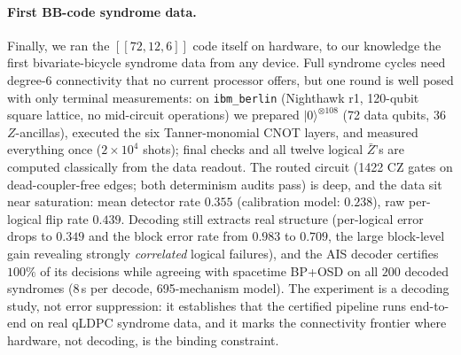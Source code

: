 \documentclass[a4paper,11pt]{quantumarticle}
\theoremstyle{definition}
\begin{document}
\paragraph{First BB-code syndrome data.}
Finally, we ran the $[\![72,12,6]\!]$ code itself on hardware, to our
knowledge the first bivariate-bicycle syndrome data from any device. Full
syndrome cycles need degree-6 connectivity that no current processor
offers, but one round is well posed with only terminal measurements:
on \texttt{ibm\_berlin} (Nighthawk r1, 120-qubit square lattice, no
mid-circuit operations) we prepared $|0\rangle^{\otimes108}$ (72 data
qubits, 36 $Z$-ancillas), executed the six Tanner-monomial CNOT layers,
and measured everything once ($2\times10^4$ shots); final checks and all
twelve logical $\bar Z$'s are computed classically from the data readout.
The routed circuit (1422 CZ gates on dead-coupler-free edges; both
determinism audits pass) is deep, and the data sit near saturation: mean
detector rate $0.355$ (calibration model: $0.238$), raw per-logical flip
rate $0.439$. Decoding still extracts real structure (per-logical error
drops to $0.349$ and the block error rate from $0.983$ to $0.709$, the
large block-level gain revealing strongly \emph{correlated} logical
failures), and the AIS decoder certifies $100\%$ of its decisions while
agreeing with spacetime BP+OSD on all $200$ decoded syndromes ($8$\,s per
decode, 695-mechanism model). The experiment is a decoding study, not
error suppression: it establishes that the certified pipeline runs
end-to-end on real qLDPC syndrome data, and it marks the connectivity
frontier where hardware, not decoding, is the binding constraint.
\end{document}
